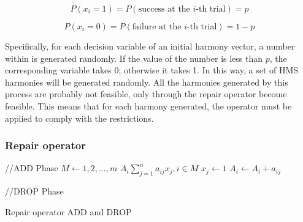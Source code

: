 \begin{equation} \label{ec:bernoullie_p} 
P(x_i=1) = P(\text{success at the $i$-th trial}) = p 
\end{equation}	

\begin{equation} \label{ec:bernoullie_p-1} 
P(x_i=0) = P(\text{failure at the $i$-th trial}) = 1-p
\end{equation}	

Specifically, for each decision variable of an initial harmony vector, a number within is generated randomly. If the value of the number is less than $p$, the corresponding variable takes 0; otherwise it takes 1. In this way, a set of HMS harmonies will be generated randomly. All the harmonies generated by this process are probably not feasible, only through the repair operator become feasible. This means that for each harmony generated, the operator must be applied to comply with the restrictions.

\subsubsection{Repair operator}

\begin{algorithm}
\begin{algorithmic}[1]
 \STATE //ADD Phase
\STATE $M \gets 1,2,\ldots, m$
\STATE $A_i \sum_{j=1}^{n} a_{ij}x_{j}, i \in M$
 {
	 {
		\STATE $x_j \gets 1$
		\STATE $A_i \gets A_i + a_{ij}$
	}\ENDIF
} \ENDFOR

\STATE //DROP Phase
 \ENDFOR

\caption{Repair operator ADD and DROP}\label{alg:addAndDrop}
\end{algorithmic}
\end{algorithm}



